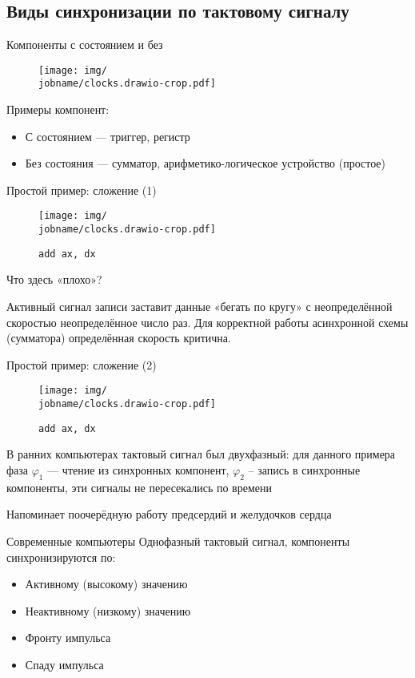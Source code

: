 \documentclass[xetex,aspectratio=43]{beamer}
\begin{document}
\subsection{Виды синхронизации по тактовому сигналу}

\begin{frame}{Компоненты с состоянием и без}
    \begin{figure}
        \texttt{[image: img/\\jobname/clocks.drawio-crop.pdf]}
    \end{figure}
    \pause
    Примеры компонент:
    \begin{itemize}
        \item С состоянием --- триггер, регистр
        \item Без состояния --- сумматор, арифметико-логическое устройство (простое)
    \end{itemize}
\end{frame}

\begin{frame}[fragile]{Простой пример: сложение (1)}
    \begin{figure}
        \texttt{[image: img/\\jobname/clocks.drawio-crop.pdf]}
        \caption{\texttt{add ax, dx}}
    \end{figure}
    Что здесь «плохо»?
    \pause

    Активный сигнал записи заставит данные «бегать по кругу» с неопределённой скоростью неопределённое число раз. Для корректной работы асинхронной схемы (сумматора) определённая скорость критична.
\end{frame}

\begin{frame}[fragile]{Простой пример: сложение (2)}
    \begin{figure}
        \texttt{[image: img/\\jobname/clocks.drawio-crop.pdf]}
        \caption{\texttt{add ax, dx}}
    \end{figure}

    В ранних компьютерах тактовый сигнал был двухфазный: для данного примера фаза $\varphi_1$ --- чтение из синхронных компонент, $\varphi_2$ -- запись в синхронные компоненты, эти сигналы не пересекались по времени

    \pause

    Напоминает поочерёдную работу предсердий и желудочков сердца
\end{frame}

\begin{frame}{Современные компьютеры}
    Однофазный тактовый сигнал, компоненты синхронизируются по:
    \begin{itemize}
        \item Активному (высокому) значению
        \item Неактивному (низкому) значению
        \item Фронту импульса
        \item Спаду импульса
    \end{itemize}
\end{frame}
\end{document}
